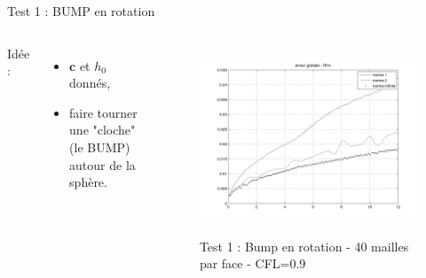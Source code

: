 \documentclass[11pt]{beamer}
\begin{document}
\begin{frame}{Test 1 : BUMP en rotation}
\begin{columns}
Idée :

\begin{itemize}
\item $\mathbf{c}$ et $h_0$ donnés,

\item faire tourner une "cloche" (le BUMP) autour de la sphère.
\end{itemize}



\begin{figure}
\href{run:CSapprox_test0.avi}{\includegraphics[scale=0.25]{normerreur_test0_100cfl90.png}} 
\caption{Test 1 : Bump en rotation - 40 mailles par face - CFL=0.9}
\end{figure}

\end{columns}
\end{frame}

\end{document}
